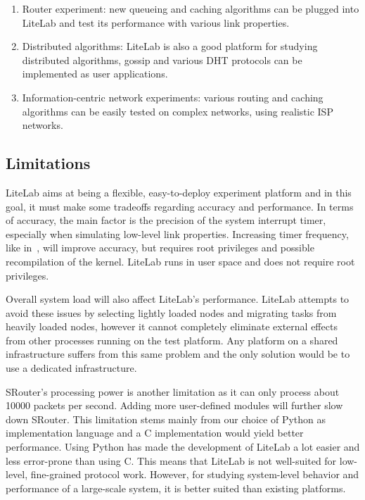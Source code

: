 \documentclass[conference]{IEEEtran}
\begin{document}
\begin{enumerate}

\item Router experiment: new queueing and caching algorithms can be
  plugged into LiteLab and test its performance with various link
  properties.

\item Distributed algorithms: LiteLab is also a good platform for
  studying distributed algorithms, gossip and various DHT protocols
  can be implemented as user applications.

\item Information-centric network experiments: various routing and
  caching algorithms can be easily tested on complex networks, using
  realistic ISP networks.
\end{enumerate}







\subsection{Limitations}
\label{sec:evaluation:limitation}

LiteLab aims at being a flexible, easy-to-deploy experiment platform
and in this goal, it must make some tradeoffs regarding accuracy and
performance. In terms of accuracy, the main factor is the precision of
the system interrupt timer, especially when simulating low-level link
properties. Increasing timer frequency, like in~\cite{White:osdi02},
will improve accuracy, but requires root privileges and possible
recompilation of the kernel. LiteLab runs in user space and does not
require root privileges.



Overall system load will also affect LiteLab's performance. LiteLab
attempts to avoid these issues by selecting lightly loaded nodes and
migrating tasks from heavily loaded nodes, however it cannot
completely eliminate external effects from other processes running on
the test platform. Any platform on a shared infrastructure suffers
from this same problem and the only solution would be to use a
dedicated infrastructure.



SRouter's processing power is another limitation as it can only
process about 10000 packets per second. Adding more user-defined
modules will further slow down SRouter. This limitation stems mainly
from our choice of Python as implementation language and a C
implementation would yield better performance. Using Python has made
the development of LiteLab a lot easier and less error-prone than
using C. This means that LiteLab is not well-suited for low-level,
fine-grained protocol work. However, for studying system-level
behavior and performance of a large-scale system, it is better suited
than existing platforms.
\end{document}
